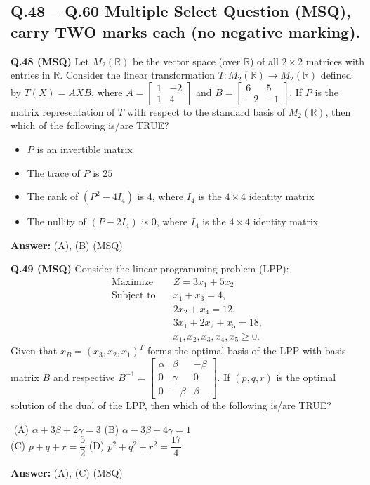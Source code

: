 \documentclass[11pt,a4paper]{article}
\newcommand{\optsfourA}[4]{%
  \begin{tabbing}
    \hspace{0.48\linewidth}\=\kill
    (A) #1 \> (B) #2 \\[2pt]
    (C) #3 \> (D) #4
  \end{tabbing}%
}
\newcommand{\optslistA}[4]{%
  \begin{itemize}
    \setlength{\itemsep}{2pt}\setlength{\parskip}{0pt}
    \item[(A)] #1
    \item[(B)] #2
    \item[(C)] #3
    \item[(D)] #4
  \end{itemize}%
}
\newcommand{\ans}[1]{\textbf{Answer:} #1\par\medskip}
\begin{document}
\subsection*{Q.48 -- Q.60 Multiple Select Question (MSQ), carry TWO marks each (no negative marking).}

\textbf{Q.48 (MSQ)} Let $M_2(\mathbb{R})$ be the vector space (over $\mathbb{R}$) of all $2 \times 2$ matrices with entries in $\mathbb{R}$. Consider the linear transformation $T : M_2(\mathbb{R}) \to M_2(\mathbb{R})$ defined by $T(X) = AXB$, where $A = \begin{bmatrix} 1 & -2 \\ 1 & 4 \end{bmatrix}$ and $B = \begin{bmatrix} 6 & 5 \\ -2 & -1 \end{bmatrix}$. If $P$ is the matrix representation of $T$ with respect to the standard basis of $M_2(\mathbb{R})$, then which of the following is/are TRUE?
\optslistA{$P$ is an invertible matrix}{The trace of $P$ is $25$}{The rank of $(P^2 - 4I_4)$ is $4$, where $I_4$ is the $4 \times 4$ identity matrix}{The nullity of $(P - 2I_4)$ is $0$, where $I_4$ is the $4 \times 4$ identity matrix}
\ans{(A), (B) (MSQ)}

\textbf{Q.49 (MSQ)} Consider the linear programming problem (LPP):
\begin{align*}
  \text{Maximize} \quad & Z = 3x_1 + 5x_2 \\
  \text{Subject to} \quad & x_1 + x_3 = 4, \\
  & 2x_2 + x_4 = 12, \\
  & 3x_1 + 2x_2 + x_5 = 18, \\
  & x_1, x_2, x_3, x_4, x_5 \ge 0.
\end{align*}
Given that $x_B = (x_3, x_2, x_1)^T$ forms the optimal basis of the LPP with basis matrix $B$ and respective $B^{-1} = \begin{bmatrix} \alpha & \beta & -\beta \\ 0 & \gamma & 0 \\ 0 & -\beta & \beta \end{bmatrix}$. If $(p, q, r)$ is the optimal solution of the dual of the LPP, then which of the following is/are TRUE?
\optsfourA{$\alpha + 3\beta + 2\gamma = 3$}{$\alpha - 3\beta + 4\gamma = 1$}{$p + q + r = \dfrac{5}{2}$}{$p^2 + q^2 + r^2 = \dfrac{17}{4}$}
\ans{(A), (C) (MSQ)}
\end{document}
